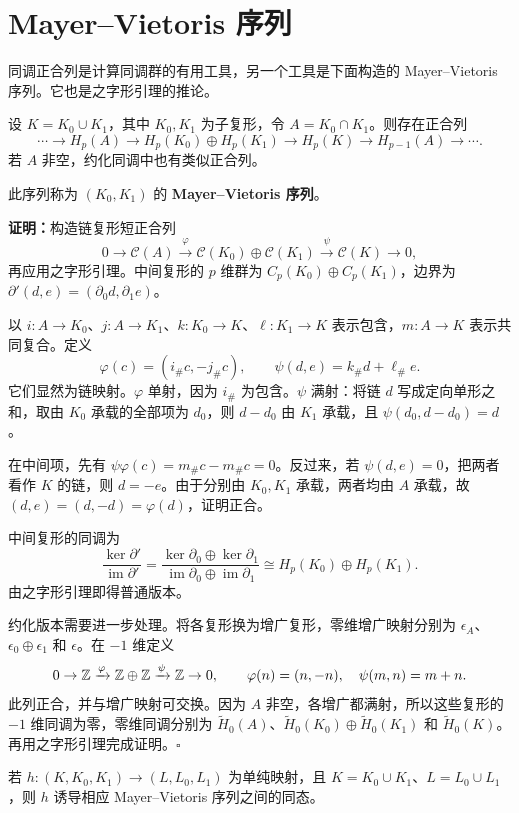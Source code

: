 \section{Mayer--Vietoris 序列}
同调正合列是计算同调群的有用工具，另一个工具是下面构造的 Mayer--Vietoris 序列。它也是之字形引理的推论。

设 $K=K_0\cup K_1$，其中 $K_0,K_1$ 为子复形，令 $A=K_0\cap K_1$。则存在正合列
\[
\cdots\to H_p(A)\to H_p(K_0)\oplus H_p(K_1)\to H_p(K)\to H_{p-1}(A)\to\cdots.
\]
若 $A$ 非空，约化同调中也有类似正合列。

此序列称为 $(K_0,K_1)$ 的 \textbf{Mayer--Vietoris 序列}。

\noindent\textbf{证明：}构造链复形短正合列
\[
0\to\mathcal C(A)\xrightarrow{\varphi}\mathcal C(K_0)\oplus\mathcal C(K_1)
\xrightarrow{\psi}\mathcal C(K)\to0,
\]
再应用之字形引理。中间复形的 $p$ 维群为 $C_p(K_0)\oplus C_p(K_1)$，边界为 $\partial'(d,e)=(\partial_0d,\partial_1e)$。

以 $i:A\to K_0$、$j:A\to K_1$、$k:K_0\to K$、$\ell:K_1\to K$ 表示包含，$m:A\to K$ 表示共同复合。定义
\[
\varphi(c)=(i_\#c,-j_\#c),\qquad
\psi(d,e)=k_\#d+\ell_\#e.
\]
它们显然为链映射。$\varphi$ 单射，因为 $i_\#$ 为包含。$\psi$ 满射：将链 $d$ 写成定向单形之和，取由 $K_0$ 承载的全部项为 $d_0$，则 $d-d_0$ 由 $K_1$ 承载，且 $\psi(d_0,d-d_0)=d$。

在中间项，先有 $\psi\varphi(c)=m_\#c-m_\#c=0$。反过来，若 $\psi(d,e)=0$，把两者看作 $K$ 的链，则 $d=-e$。由于分别由 $K_0,K_1$ 承载，两者均由 $A$ 承载，故 $(d,e)=(d,-d)=\varphi(d)$，证明正合。

中间复形的同调为
\[
\frac{\ker\partial'}{\operatorname{im}\partial'}
=\frac{\ker\partial_0\oplus\ker\partial_1}{\operatorname{im}\partial_0\oplus\operatorname{im}\partial_1}
\cong H_p(K_0)\oplus H_p(K_1).
\]
由之字形引理即得普通版本。

约化版本需要进一步处理。将各复形换为增广复形，零维增广映射分别为 $\epsilon_A$、$\epsilon_0\oplus\epsilon_1$ 和 $\epsilon$。在 $-1$ 维定义
\[
0\to\mathbb{Z}\xrightarrow{\varphi}\mathbb{Z}\oplus\mathbb{Z}\xrightarrow{\psi}\mathbb{Z}\to0,
\qquad\varphi(n)=(n,-n),\quad\psi(m,n)=m+n.
\]
此列正合，并与增广映射可交换。因为 $A$ 非空，各增广都满射，所以这些复形的 $-1$ 维同调为零，零维同调分别为 $\widetilde H_0(A)$、$\widetilde H_0(K_0)\oplus\widetilde H_0(K_1)$ 和 $\widetilde H_0(K)$。再用之字形引理完成证明。\hfill$\square$

若 $h:(K,K_0,K_1)\to(L,L_0,L_1)$ 为单纯映射，且 $K=K_0\cup K_1$、$L=L_0\cup L_1$，则 $h$ 诱导相应 Mayer--Vietoris 序列之间的同态。

